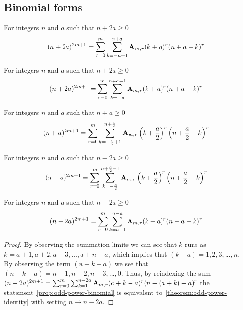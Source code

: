 \subsection{Binomial forms}\label{subsec:binomial-forms}

\begin{corollary}
    \label{prop:binomial-form}
    For integers $n$ and $a$ such that $n+2a \geq 0$
    \begin{align*}
    (n+2a)^{2m+1} = \sum_{r=0}^{m} \sum_{k=-a+1}^{n+a} {\mathbf{A}} \sb{m,r} (k+a)^r (n+a-k)^r
    \end{align*}
\end{corollary}

\begin{corollary}
    \label{prop:shifted-binomial-form}
    For integers $n$ and $a$ such that $n+2a \geq 0$
    \begin{align*}
    (n+2a)^{2m+1} = \sum_{r=0}^{m} \sum_{k=-a}^{n+a-1} {\mathbf{A}} \sb{m,r} (k+a)^r (n+a-k)^r
    \end{align*}
\end{corollary}

\begin{corollary}
    \label{cor:centered-binomial-form}
    For integers $n$ and $a$ such that $n+a \geq 0$
    \begin{align*}
    (n+a)^{2m+1} = \sum_{r=0}^{m} \sum_{k=-\frac{a}{2}+1}^{n+\frac{a}{2}} {\mathbf{A}} \sb{m,r} \left( k+\frac{a}{2} \right)^r \left( n+\frac{a}{2}-k \right)^r
    \end{align*}
\end{corollary}

\begin{corollary}
    \label{cor:shifted-centered-binomial-form}
    For integers $n$ and $a$ such that $n-2a \geq 0$
    \begin{align*}
    (n+a)^{2m+1} = \sum_{r=0}^{m} \sum_{k=-\frac{a}{2}}^{n+\frac{a}{2}-1} {\mathbf{A}} \sb{m,r} \left( k+\frac{a}{2} \right)^r \left( n+\frac{a}{2}-k \right)^r
    \end{align*}
\end{corollary}

\begin{proposition}
    \label{prop:negated-binomial-form}
    For integers $n$ and $a$ such that $n-2a \geq 0$
    \begin{align*}
    (n-2a)^{2m+1} = \sum_{r=0}^{m} \sum_{k=a+1}^{n-a} {\mathbf{A}} \sb{m,r} (k-a)^r (n-a-k)^r
    \end{align*}
    \begin{proof}
        By observing the summation limits we can see that $k$ runs as $k=a+1,a+2,a+3,\ldots,a+n-a$, which
        implies that $(k-a)=1,2,3,\ldots, n$.
        By observing the term $(n-k-a)$ we see that $(n-k-a)=n-1,n-2,n-3,\ldots,0$.
        Thus, by reindexing the sum
        $(n-2a)^{2m+1} = \sum_{r=0}^{m} \sum_{k=1}^{n-2a} {\mathbf{A}} \sb{m,r} (a+k-a)^r (n-(a+k)-a)^r$
        the statement~\eqref{prop:odd-power-binomial} is equivalent to~\eqref{theorem:odd-power-identity}
        with setting $n \rightarrow n-2a$.
    \end{proof}
\end{proposition}

